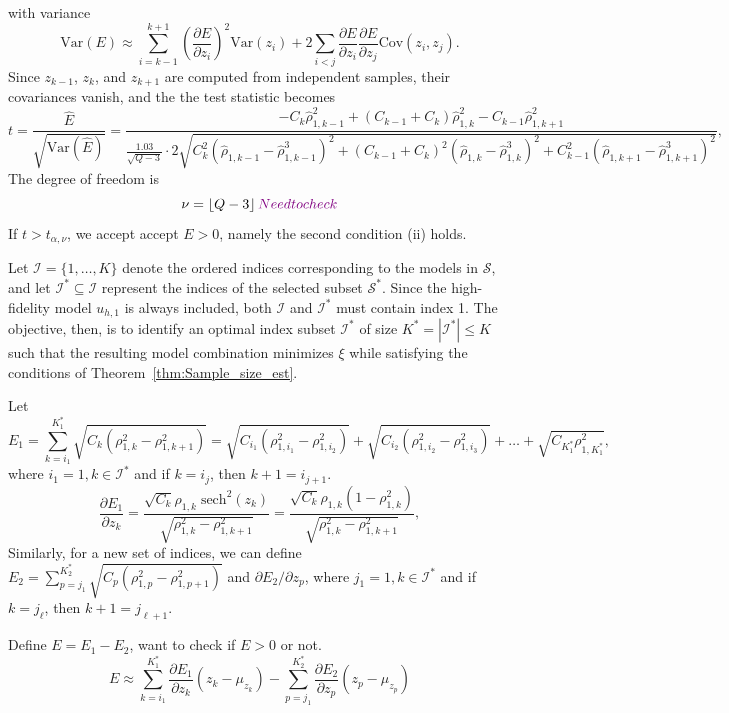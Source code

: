 with variance
\[
\text{Var}(E)\approx \sum_{i=k-1}^{k+1}\left(\frac{\partial E}{\partial z_i}\right)^2 \text{Var}(z_i) + 2\sum_{i<j}\frac{\partial E}{\partial z_i}\frac{\partial E}{\partial z_j}\text{Cov}(z_i,z_j).
\]
Since $z_{k-1}$, $z_k$, and $z_{k+1}$ are computed from independent samples, their covariances vanish, and the the test statistic becomes
%
\begin{equation}\label{eq:Conidtion_2_t_test}
    t=\frac{\widehat E}{\sqrt{\text{Var}(\widehat E)}} = \frac{-C_{k}\widehat\rho_{1,k-1}^2+(C_{k-1} + C_k)\widehat \rho_{1,k}^2  - C_{k-1}\widehat \rho_{1,k+1}^2}{\frac{1.03}{\sqrt{Q-3}}\cdot 2\sqrt{C_k^2(\widehat\rho_{1,k-1}- \widehat\rho_{1,k-1}^3)^2+(C_{k-1} + C_k)^2 (\widehat\rho_{1,k}- \widehat\rho_{1,k}^3)^2+C_{k-1}^2 (\widehat\rho_{1,k+1}- \widehat\rho_{1,k+1}^3)^2}},
\end{equation}
%
The degree of freedom is 
\[
\nu = \left\lfloor Q-3 \right\rfloor {\textcolor{violet}{Need to check}}
\]
%
If $t>t_{\alpha,\nu}$, we accept accept $E>0$, namely the second condition (ii) holds.



Let $\mathcal{I} = \{1,\ldots,K\}$ denote the ordered indices corresponding to the models in $\mathcal{S}$, and let $\mathcal{I}^*\subseteq \mathcal{I}$ represent the indices of the selected subset $\mathcal{S}^*$. Since the high-fidelity model $u_{h,1}$ is always included, both $\mathcal{I}$ and $\mathcal{I}^*$ must contain index 1. The objective, then, is to identify an optimal index subset $\mathcal{I}^*$ of size $K^* = |\mathcal{I}^*| \leq K$ such that the resulting model combination minimizes $\xi$ while satisfying the conditions of Theorem~\ref{thm:Sample_size_est}.


Let 
\[
E_1=\sum_{k=i_1}^{K_1^*}\sqrt{C_k(\rho_{1,k}^2-\rho_{1,k+1}^2)} = \sqrt{C_{i_1}(\rho_{1,i_1}^2-\rho_{1,i_2}^2)}+\sqrt{C_{i_2}(\rho_{1,i_2}^2-\rho_{1,i_3}^2)}+\ldots+\sqrt{C_{K_1^*}\rho_{1,K_1^*}^2},
\]
where $i_1=1, k\in \mathcal{I}^*$ and if $k=i_j$, then $k+1 = i_{j+1}$.
\[
\frac{\partial E_1}{\partial z_k} = \frac{\sqrt{C_k} \rho_{1,k}\;\text{sech}^2(z_k)}{\sqrt{ \rho_{1,k}^2-\rho_{1,k+1}^2}}= \frac{\sqrt{C_k} \rho_{1,k}(1- \rho_{1,k}^2)}{\sqrt{\rho_{1,k}^2-\rho_{1,k+1}^2}},
\]
Similarly, for a new set of indices, we can define $E_2=\sum_{p=j_1}^{K_2^*}\sqrt{C_p( \rho_{1,p}^2-\rho_{1,p+1}^2)}$ and $\partial E_2/\partial z_p$, where $j_1=1, k\in \mathcal{I}^*$ and if $k=j_\ell$, then $k+1 = j_{\ell+1}$.

Define $E = E_1-E_2$, want to check if $E>0$ or not.
\[
E\approx \sum_{k=i_1}^{K_1^*} \frac{\partial E_1}{\partial z_k}(z_k - \mu_{z_k}) - \sum_{p=j_1}^{K_2^*} \frac{\partial E_2}{\partial z_p}(z_p - \mu_{z_p})
\]

